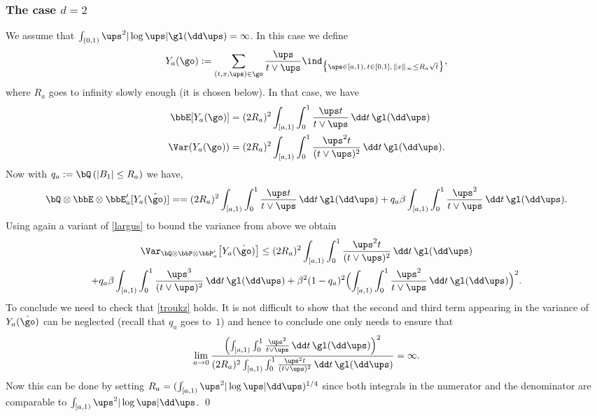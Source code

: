 \subsubsection{The case $d= 2$}
We assume that
$\int_{(0,1)} \ups^2 |\log \ups| \gl (\dd \ups)=\infty$.
In this case we define
\begin{equation}
Y_a(\go):= \sum_{(t,x,\ups)\in \go} \frac{\ups}{t\vee \ups} \ind_{\bigl\{ \ups \in [a,1),\, t\in[0,1],\, \|x\|_{\infty}\le R_a \sqrt{t} \bigr\}},
\end{equation}
where $R_a$ goes to infinity slowly enough (it is chosen below).
In that case, we have
\begin{equation}\begin{split}
\label{fm11}
\bbE[Y_a(\go)]&= (2R_a)^2 \int_{[a,1)} \int^1_0\frac{\ups t}{t\vee \ups} \,\dd t\,\gl(\dd \ups) \\ \Var(Y_a(\go))&=(2R_a)^2 \int_{[a,1)}\int^1_0 \frac{\ups^2 t}{(t\vee \ups)^2} \,\dd t\,\gl(\dd \ups).
\end{split}
\end{equation}
Now with $q_a:=\bQ\left(|B_1|\leq R_a \right)$ we have,\vspace*{-5pt}
\[\label{fm22}
\bQ\otimes \bbE\otimes \bbE'_a[Y_a(\hat \go)]=
= (2R_a)^2 \int_{[a,1)} \int^1_0\frac{\ups t}{t\vee \ups} \,\dd t\,\gl(\dd \ups)+q_a\beta \int_{[a,1)} \int^1_0\frac{\ups^2 }{t\vee \ups} \,\dd t\,\gl(\dd \ups).
\]
Using again a variant of \eqref{largus} to bound the variance from above we obtain\vspace*{-5pt}
\begin{multline}\label{fm33}
\Var_{\bQ\otimes \bbP\otimes \bbP'_a} \bigl[ Y_a(\hat\go)\big ]\le (2R_a)^2 \int_{[a,1)} \int^1_0\frac{\ups^2 t}{(t\vee \ups)^2} \,\dd t\,\gl(\dd \ups)\\+q_a\beta \int_{[a,1)} \int^1_0\frac{\ups^3 }{(t\vee \ups)^2} \,\dd t\,\gl(\dd \ups)+
\beta^2(1-q_a)^2\Bigl(\int_{[a,1)} \int^1_0\frac{\ups^2 }{t\vee \ups} \,\dd t\,\gl(\dd \ups) \Bigr)^2.
\end{multline}
To conclude we need to check that \eqref{troukz} holds. It is not difficult to show that the second and third term appearing in the variance of $Y_a(\hat\go)$ can be neglected (recall that $q_a$ goes to~$1$) and hence to conclude one only needs to ensure that
\begin{equation}
\lim_{a\to 0} \frac{\left(\int_{[a,1)} \int^1_0\frac{\ups^2 }{t\vee \ups} \,\dd t\,\gl(\dd \ups)\right)^2}{(2R_a)^2 \int_{[a,1)} \int^1_0\frac{\ups^2 t}{(t\vee \ups)^2} \,\dd t\,\gl(\dd \ups)}=\infty.
\end{equation}
Now this can be done by setting $R_a= (\int_{[a,1)} \ups^2 |\log \ups| \dd \ups)^{1/4}$
since both integrals in the numerator and the denominator are comparable to
$\int_{[a,1)} \ups^2 |\log \ups| \dd \ups$.
\qed

